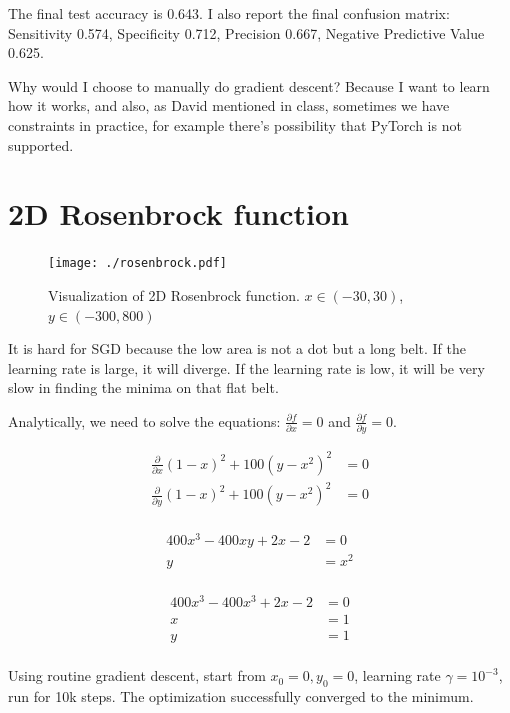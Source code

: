 The final test accuracy is 0.643.
I also report the final confusion matrix:
Sensitivity 0.574, Specificity 0.712,
Precision 0.667, Negative Predictive Value 0.625.

Why would I choose to manually do gradient descent?
Because I want to learn how it works, and also, as David mentioned in class, sometimes we have constraints in practice, for example there's possibility that PyTorch is not supported.

\newpage
\section{2D Rosenbrock function}
\begin{figure}[h]
    \texttt{[image: ./rosenbrock.pdf]}
    \caption{Visualization of 2D Rosenbrock function. $x \in (-30,30)$, $y \in (-300,800)$}
\end{figure}

It is hard for SGD because the low area is not a dot but a long belt.
If the learning rate is large, it will diverge.
If the learning rate is low, it will be very slow in finding the minima on that flat belt.

Analytically, we need to solve the equations: $\frac{\partial f}{\partial x} = 0$ and $\frac{\partial f}{\partial y} = 0$.

\begin{align*}[left = \empheqlbrace]
    \frac{\partial}{\partial x} (1-x)^2+100(y-x^2)^2 & = 0 \\
    \frac{\partial}{\partial y} (1-x)^2+100(y-x^2)^2 & = 0 \\
\end{align*}

\begin{align*}[left = \empheqlbrace]
    400x^3-400xy+2x-2 & = 0  \\
    y                 & =x^2 \\
\end{align*}

\begin{align*}
    400x^3-400x^3+2x-2 & = 0 \\
    x                  & =1  \\
    y                  & =1  \\
\end{align*}

Using routine gradient descent, start from $x_0=0, y_0=0$, learning rate $\gamma=10^{-3}$, run for 10k steps.
The optimization successfully converged to the minimum.

